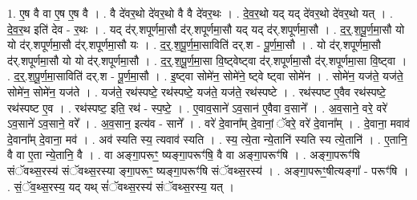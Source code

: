 \documentclass[17pt]{extarticle}
\begin{document}
1. ए॒ष वै वा ए॒ष ए॒ष वै । . वै दे॑वर॒थो दे॑वर॒थो वै वै दे॑वर॒थः । . दे॒व॒र॒थो यद् यद् दे॑वर॒थो दे॑वर॒थो यत् । . दे॒व॒र॒थ इति॑ देव - र॒थः । . यद् द॑र्.शपूर्णमा॒सौ द॑र्.शपूर्णमा॒सौ यद् यद् द॑र्.शपूर्णमा॒सौ । . द॒र्॒.श॒पू॒र्ण॒मा॒सौ यो यो द॑र्.शपूर्णमा॒सौ द॑र्.शपूर्णमा॒सौ यः । . द॒र्॒.श॒पू॒र्ण॒मा॒साविति॑ दर्.श - पू॒र्ण॒मा॒सौ । . यो द॑र्.शपूर्णमा॒सौ द॑र्.शपूर्णमा॒सौ यो यो द॑र्.शपूर्णमा॒सौ । . द॒र्॒.श॒पू॒र्ण॒मा॒सा वि॒ष्ट्वेष्ट्वा द॑र्.शपूर्णमा॒सौ द॑र्.शपूर्णमा॒सा वि॒ष्ट्वा । . द॒र्॒.श॒पू॒र्ण॒मा॒साविति॑ दर्.श - पू॒र्ण॒मा॒सौ । . इ॒ष्ट्वा सोमे॑न॒ सोमे॑ने॒ ष्ट्वे ष्ट्वा सोमे॑न । . सोमे॑न॒ यज॑ते॒ यज॑ते॒ सोमे॑न॒ सोमे॑न॒ यज॑ते । . यज॑ते॒ रथ॑स्पष्टे॒ रथ॑स्पष्टे॒ यज॑ते॒ यज॑ते॒ रथ॑स्पष्टे । . रथ॑स्पष्ट ए॒वैव रथ॑स्पष्टे॒ रथ॑स्पष्ट ए॒व । . रथ॑स्पष्ट॒ इति॒ रथ॑ - स्प॒ष्टे॒ । . ए॒वाव॒साने॑ ऽव॒सान॑ ए॒वैवा व॒साने᳚ । . अ॒व॒साने॒ वरे॒ वरे॑ ऽव॒साने॑ ऽव॒साने॒ वरे᳚ । . अ॒व॒सान॒ इत्य॑व - साने᳚ । . वरे॑ दे॒वाना᳚म् दे॒वानां॒ ॅवरे॒ वरे॑ दे॒वाना᳚म् । . दे॒वाना॒ मवाव॑ दे॒वाना᳚म् दे॒वाना॒ मव॑ । . अव॑ स्यति स्य॒ त्यवाव॑ स्यति । . स्य॒ त्ये॒ता न्ये॒तानि॑ स्यति स्य त्ये॒तानि॑ । . ए॒तानि॒ वै वा ए॒ता न्ये॒तानि॒ वै । . वा अङ्गा॒परूꣳ॒॒ ष्यङ्गा॒परूꣳ॑षि॒ वै वा अङ्गा॒परूꣳ॑षि । . अङ्गा॒परूꣳ॑षि संॅवथ्स॒रस्य॑ संॅवथ्स॒रस्या ङ्गा॒परूꣳ॒॒ ष्यङ्गा॒परूꣳ॑षि संॅवथ्स॒रस्य॑ । . अङ्गा॒परूꣳ॒॒षीत्यङ्गा᳚ - परूꣳ॑षि । . सं॒ॅव॒थ्स॒रस्य॒ यद् यथ् सं॑ॅवथ्स॒रस्य॑ संॅवथ्स॒रस्य॒ यत् । \newline
\end{document}
